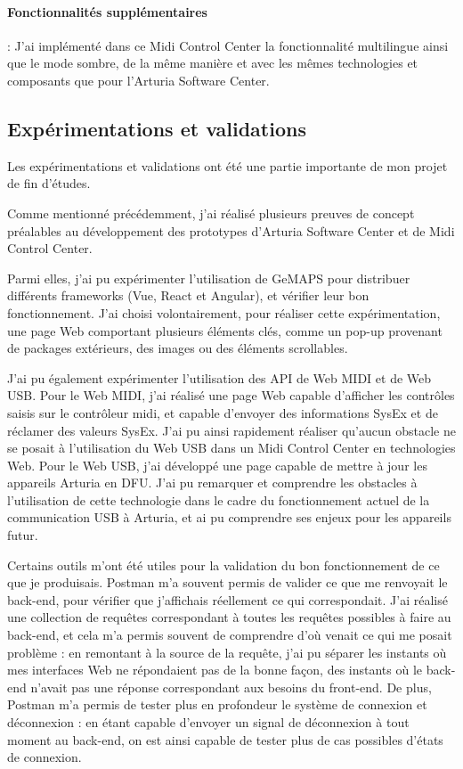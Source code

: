 \documentclass[francais]{rapportPFE}  %
\begin{document}
\paragraph{Fonctionnalités supplémentaires}:
J'ai implémenté dans ce Midi Control Center la fonctionnalité multilingue ainsi que le mode sombre, de la même manière et avec les mêmes technologies et composants que pour l'Arturia Software Center.

\subsection{Expérimentations et validations}

Les expérimentations et validations ont été une partie importante de mon projet de fin d'études.

Comme mentionné précédemment, j'ai réalisé plusieurs preuves de concept préalables au développement des prototypes d'Arturia Software Center et de Midi Control Center.

Parmi elles, j'ai pu expérimenter l'utilisation de GeMAPS pour distribuer différents frameworks (Vue, React et Angular), et vérifier leur bon fonctionnement. J'ai choisi volontairement, pour réaliser cette expérimentation, une page Web comportant plusieurs éléments clés, comme un pop-up provenant de packages extérieurs, des images ou des éléments scrollables.

J'ai pu également expérimenter l'utilisation des API de Web MIDI et de Web USB.
Pour le Web MIDI, j'ai réalisé une page Web capable d'afficher les contrôles saisis sur le contrôleur midi, et capable d'envoyer des informations SysEx et de réclamer des valeurs SysEx. J'ai pu ainsi rapidement réaliser qu'aucun obstacle ne se posait à l'utilisation du Web USB dans un Midi Control Center en technologies Web.
Pour le Web USB, j'ai développé une page capable de mettre à jour les appareils Arturia en DFU. J'ai pu remarquer et comprendre les obstacles à l'utilisation de cette technologie dans le cadre du fonctionnement actuel de la communication USB à Arturia, et ai pu comprendre ses enjeux pour les appareils futur.

Certains outils m'ont été utiles pour la validation du bon fonctionnement de ce que je produisais. Postman m'a souvent permis de valider ce que me renvoyait le back-end, pour vérifier que j'affichais réellement ce qui correspondait. J'ai réalisé une collection de requêtes correspondant à toutes les requêtes possibles à faire au back-end, et cela m'a permis souvent de comprendre d'où venait ce qui me posait problème : en remontant à la source de la requête, j'ai pu séparer les instants où mes interfaces Web ne répondaient pas de la bonne façon, des instants où le back-end n'avait pas une réponse correspondant aux besoins du front-end. De plus, Postman m'a permis de tester plus en profondeur le système de connexion et déconnexion : en étant capable d'envoyer un signal de déconnexion à tout moment au back-end, on est ainsi capable de tester plus de cas possibles d'états de connexion.
\end{document}
